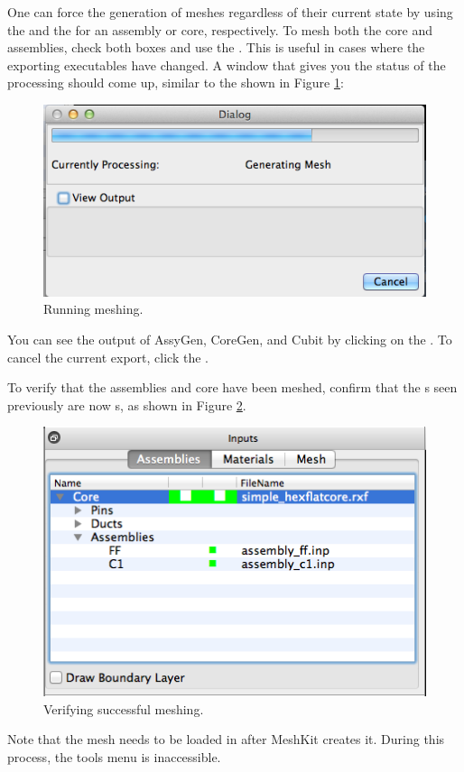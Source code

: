 One can force the generation of meshes regardless of their current state by using the  and the  for an assembly or core, respectively.  To mesh both the core and assemblies, check both boxes and use the .  This is useful in cases where the exporting executables have changed.  A window that gives you the status of the processing should come up, similar to the shown in Figure \ref{fig:Mesh5}:

\begin{figure}[H]
	\begin{center}
		\includegraphics[width=0.5\linewidth]{Images/mesh-5.png}
		\caption{Running meshing.}
		\label{fig:Mesh5}
	\end{center}
\end{figure}

You can see the output of AssyGen, CoreGen, and Cubit by clicking on the .  To cancel the current export, click the .

To verify that the assemblies and core have been meshed, confirm that the s seen previously are now s, as shown in Figure \ref{fig:Mesh6}.

\begin{figure}[H]
	\begin{center}
		\includegraphics[width=0.5\linewidth]{Images/mesh-6.png}
		\caption{Verifying successful meshing.}
		\label{fig:Mesh6}
	\end{center}
\end{figure}

Note that the mesh needs to be loaded in after MeshKit creates it.  During this process, the tools menu is inaccessible.